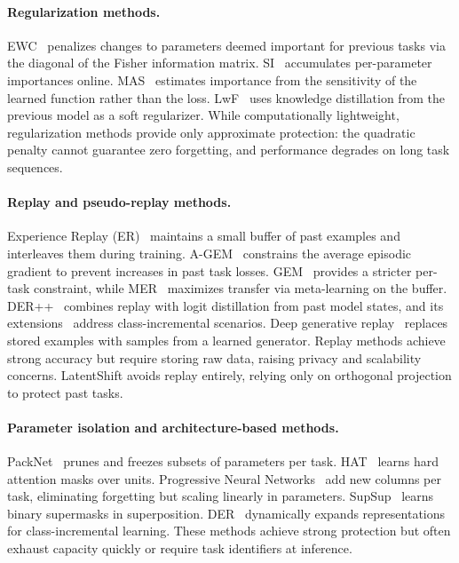 \documentclass{article}
\begin{document}
\paragraph{Regularization methods.}
EWC~\citep{kirkpatrick2017overcoming} penalizes changes to parameters deemed
important for previous tasks via the diagonal of the Fisher information matrix.
SI~\citep{zenke2017continual} accumulates per-parameter importances online.
MAS~\citep{aljundi2018memory} estimates importance from the sensitivity of the
learned function rather than the loss. LwF~\citep{li2017learning} uses
knowledge distillation from the previous model as a soft regularizer.
While computationally lightweight, regularization methods provide only
approximate protection: the quadratic penalty cannot guarantee zero forgetting,
and performance degrades on long task sequences.

\paragraph{Replay and pseudo-replay methods.}
Experience Replay (ER)~\citep{chaudhry2019tiny} maintains a small buffer of
past examples and interleaves them during training. A-GEM~\citep{chaudhry2019efficient}
constrains the average episodic gradient to prevent increases in past task losses.
GEM~\citep{lopez2017gradient} provides a stricter per-task constraint, while
MER~\citep{riemer2019learning} maximizes transfer via meta-learning on the
buffer. DER++~\citep{buzzega2020dark} combines replay with logit distillation
from past model states, and its extensions~\citep{boschini2022class} address
class-incremental scenarios. Deep generative replay~\citep{shin2017continual}
replaces stored examples with samples from a learned generator.
Replay methods achieve strong accuracy but require storing raw data, raising
privacy and scalability concerns. LatentShift avoids replay entirely, relying
only on orthogonal projection to protect past tasks.

\paragraph{Parameter isolation and architecture-based methods.}
PackNet~\citep{mallya2018packnet} prunes and freezes subsets of parameters per
task. HAT~\citep{serra2018overcoming} learns hard attention masks over units.
Progressive Neural Networks~\citep{rusu2016progressive} add new columns per task,
eliminating forgetting but scaling linearly in parameters.
SupSup~\citep{wortsman2020supermasks} learns binary supermasks in superposition.
DER~\citep{yan2021dynamically} dynamically expands representations for
class-incremental learning. These methods achieve strong protection but often
exhaust capacity quickly or require task identifiers at inference.
\end{document}
